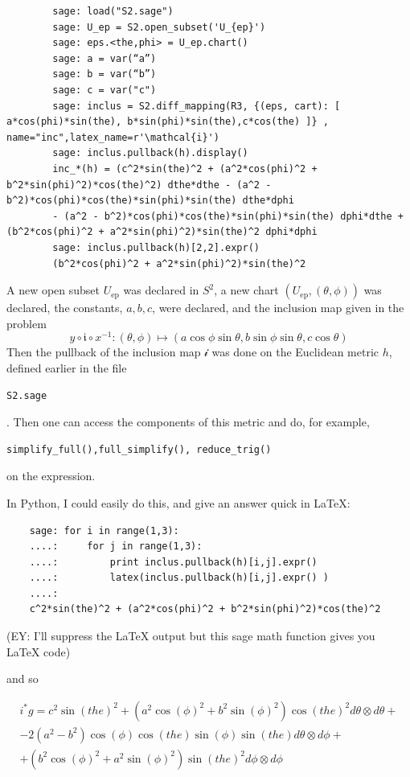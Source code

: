 	{\scriptsize \begin{verbatim}
		sage: load("S2.sage")
		sage: U_ep = S2.open_subset('U_{ep}')
		sage: eps.<the,phi> = U_ep.chart()
		sage: a = var(“a”)
		sage: b = var(“b”)
		sage: c = var("c")
		sage: inclus = S2.diff_mapping(R3, {(eps, cart): [ a*cos(phi)*sin(the), b*sin(phi)*sin(the),c*cos(the) ]} , name="inc",latex_name=r'\mathcal{i}')
		sage: inclus.pullback(h).display()
		inc_*(h) = (c^2*sin(the)^2 + (a^2*cos(phi)^2 + b^2*sin(phi)^2)*cos(the)^2) dthe*dthe - (a^2 - b^2)*cos(phi)*cos(the)*sin(phi)*sin(the) dthe*dphi 
		- (a^2 - b^2)*cos(phi)*cos(the)*sin(phi)*sin(the) dphi*dthe + (b^2*cos(phi)^2 + a^2*sin(phi)^2)*sin(the)^2 dphi*dphi
		sage: inclus.pullback(h)[2,2].expr()
		(b^2*cos(phi)^2 + a^2*sin(phi)^2)*sin(the)^2
		\end{verbatim}
	}
	A new open subset $U_{\text{ep}}$ was declared in $S^2$, a new chart $(U_{\text{ep}}, (\theta,\phi))$ was declared, the constants, $a,b,c$, were declared, and the inclusion map given in the problem
	\[
	y\circ \mathfrak{i} \circ x^{-1} : (\theta, \phi) \mapsto ( a\cos{\phi} \sin{\theta}, b \sin{\phi} \sin{\theta}, c\cos{\theta})
	\]
	Then the pullback of the inclusion map $\mathcal{i}$ was done on the Euclidean metric $h$, defined earlier in the file \begin{verbatim}S2.sage\end{verbatim}.  Then one can access the components of this metric and do, for example, \begin{verbatim}simplify_full(),full_simplify(), reduce_trig()\end{verbatim} on the expression.  
	
	In Python, I could easily do this, and give an answer quick in LaTeX:
	
	
	\begin{verbatim}
	sage: for i in range(1,3): 
	....:     for j in range(1,3):
	....:         print inclus.pullback(h)[i,j].expr()
	....:         latex(inclus.pullback(h)[i,j].expr() )
	....:         
	c^2*sin(the)^2 + (a^2*cos(phi)^2 + b^2*sin(phi)^2)*cos(the)^2
	\end{verbatim}
	(EY: I'll suppress the LaTeX output but this sage math function gives you LaTeX code)
	
	
	
	
	
	
	
	
	
	
	
	and so
	
	\[
	\boxed{ \begin{gathered}
		i^* g = c^{2} \sin\left(\mathit{the}\right)^{2} + {\left(a^{2} \cos\left(\phi\right)^{2} + b^{2} \sin\left(\phi\right)^{2}\right)} \cos\left(\mathit{the}\right)^{2} d\theta \otimes d\theta + \\
		-2 {\left(a^{2} - b^{2}\right)} \cos\left(\phi\right) \cos\left(\mathit{the}\right) \sin\left(\phi\right) \sin\left(\mathit{the}\right) d\theta \otimes d\phi +  \\
		+ {\left(b^{2} \cos\left(\phi\right)^{2} + a^{2} \sin\left(\phi\right)^{2}\right)} \sin\left(\mathit{the}\right)^{2} d\phi \otimes d\phi 
		\end{gathered} }
	\]
	
